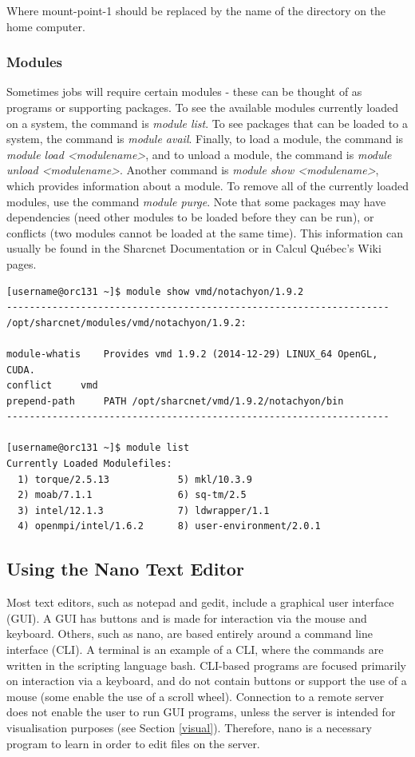 \documentclass[12pt]{article}
\begin{document}
Where mount-point-1 should be replaced by the name of the directory on the home computer.


\subsubsection{Modules}

\quad Sometimes jobs will require certain modules - these can be thought of as programs or supporting packages. To see the available modules currently loaded on a system, the command is \textit{module list}. To see packages that can be loaded to a system, the command is \textit{module avail}. Finally, to load a module, the command is \textit{module load <modulename>}, and to unload a module, the command is \textit{module unload <modulename>}. Another command is \textit{module show <modulename>}, which provides information about a module. To remove all of the currently loaded modules, use the command \textit{module purge}. Note that some packages may have dependencies (need other modules to be loaded before they can be run), or conflicts (two modules cannot be loaded at the same time). This information can usually be found in the Sharcnet Documentation or in Calcul Qu\'{e}bec's Wiki pages. 

\begin{lstlisting}[numbers=none]
[username@orc131 ~]$ module show vmd/notachyon/1.9.2 
-------------------------------------------------------------------
/opt/sharcnet/modules/vmd/notachyon/1.9.2:

module-whatis	 Provides vmd 1.9.2 (2014-12-29) LINUX_64 OpenGL, CUDA. 
conflict	 vmd 
prepend-path	 PATH /opt/sharcnet/vmd/1.9.2/notachyon/bin 
-------------------------------------------------------------------

[username@orc131 ~]$ module list
Currently Loaded Modulefiles:
  1) torque/2.5.13            5) mkl/10.3.9
  2) moab/7.1.1               6) sq-tm/2.5
  3) intel/12.1.3             7) ldwrapper/1.1
  4) openmpi/intel/1.6.2      8) user-environment/2.0.1
\end{lstlisting}


\subsection{Using the Nano Text Editor}
\quad\enskip\quad Most text editors, such as notepad and gedit, include a graphical user interface (GUI). A GUI has buttons and is made for interaction via the mouse and keyboard. Others, such as nano, are based entirely around a command line interface (CLI). A terminal is an example of a CLI, where the commands are written in the scripting language bash. CLI-based programs are focused primarily on interaction via a keyboard, and do not contain buttons or support the use of a mouse (some enable the use of a scroll wheel). Connection to a remote server does not enable the user to run GUI programs, unless the server is intended for visualisation purposes (see Section \ref{visual}). Therefore, nano is a necessary program to learn in order to edit files on the server.
\end{document}
